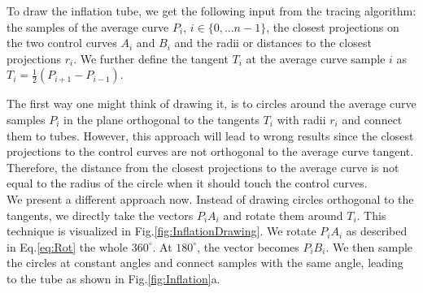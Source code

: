 \documentclass[journal, letterpaper]{IEEEtran}
\begin{document}
To draw the inflation tube, we get the following input from the tracing algorithm: the samples of the average curve $P_i$, $i\in\{0,...n-1\}$, the closest projections on the two control curves $A_i$ and $B_i$ and the radii or distances to the closest projections $r_i$. We further define the tangent $T_i$ at the average curve sample $i$ as $T_i=\frac{1}{2}(P_{i+1}-P_{i-1})$.

The first way one might think of drawing it, is to circles around the average curve samples $P_i$ in the plane orthogonal to the tangents $T_i$ with radii $r_i$ and connect them to tubes. However, this approach will lead to wrong results since the closest projections to the control curves are not orthogonal to the average curve tangent. Therefore, the distance from the closest projections to the average curve is not equal to the radius of the circle when it should touch the control curves.\\

We present a different approach now. Instead of drawing circles orthogonal to the tangents, we directly take the vectors $P_i A_i$ and rotate them around $T_i$. This technique is visualized in Fig.\ref{fig:InflationDrawing}. We rotate $P_i A_i$ as described in Eq.\ref{eq:Rot} the whole $360^{\circ}$. At $180^{\circ}$, the vector becomes $P_i B_i$. We then sample the circles at constant angles and connect samples with the same angle, leading to the tube as shown in Fig.\ref{fig:Inflation}a.
\end{document}
